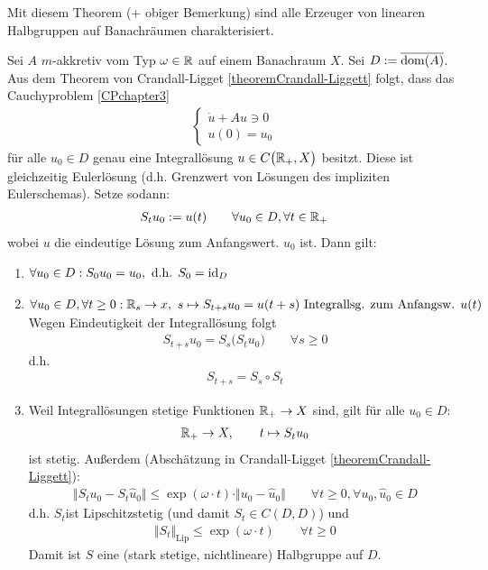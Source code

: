 Mit diesem Theorem (+ obiger Bemerkung) sind alle Erzeuger von linearen Halbgruppen auf Banachräumen charakterisiert.

\begin{beispiel}\enter
	Sei $A$ $m$-akkretiv vom Typ $\omega\in\mathbb{R}$ auf einem Banachraum $X$. Sei $D:=\overline{\operatorname{dom}(A)}$. 
	Aus dem Theorem von Crandall-Ligget \ref{theoremCrandall-Liggett} folgt, dass das Cauchyproblem \eqref{CPchapter3}
	\begin{align*}
		\left\lbrace\begin{array}{r}
			\dot{u}+Au\ni 0\\
			u(0)=u_0
		\end{array}\right.
	\end{align*}
	für alle $u_0\in D$ genau eine Integrallösung $u\in C\big(\mathbb{R}_+,X\big)$ besitzt. 
	Diese ist gleichzeitig Eulerlösung (d.h. Grenzwert von Lösungen des impliziten Eulerschemas). 
	Setze sodann:
	\begin{align*}
		S_t u_0:=u(t)\qquad\forall u_0\in D,\forall t\in\mathbb{R}_+
	\end{align*}
	wobei $u$ die eindeutige Lösung zum Anfangswert. $u_0$ ist. 
	Dann gilt:
	\begin{enumerate}[label=(\roman*)]
		\item $\begin{aligned}
			\forall u_0\in D:S_0 u_0=u_0,\text{ d.h. }S_0=\operatorname{id}_D
		\end{aligned}$
		\item $\begin{aligned}
			\forall u_0\in D,\forall t\geq 0:\mathbb{R}_s\to x,~
			s\mapsto S_{t+s} u_0=u(t+s)\text{ Integrallsg. zum Anfangsw. }u(t)
		\end{aligned}$\\
		Wegen Eindeutigkeit der Integrallösung folgt
		\begin{align*}
			S_{t+s}u_0=S_s\big( S_t u_0\big)\qquad\forall s\geq0
		\end{align*}
		d.h.
		\begin{align*}
			S_{t+s}=S_s\circ S_t
		\end{align*}
		\item Weil Integrallösungen stetige Funktionen $\mathbb{R}_+\to X$ sind, gilt für alle $u_0\in D$:
		\begin{align*}
			\mathbb{R}_+\to X,\qquad t\mapsto S_t u_0
		\end{align*}
		ist stetig. Außerdem (Abschätzung in Crandall-Ligget \ref{theoremCrandall-Liggett}):
		\begin{align*}
			\big\Vert S_t u_0-S_t\hat{u}_0\big\Vert\leq\exp(\omega\cdot t)\cdot\Vert u_0-\hat{u}_0\big\Vert\qquad\forall t\geq0,\forall u_0,\hat{u}_0\in D
		\end{align*}
		d.h. $S_t$ist Lipschitzstetig (und damit $S_t\in C(D,D)$) und 
		\begin{align*}
			\big\Vert S_t\big\Vert_{\text{Lip}}\leq\exp(\omega\cdot t)\qquad\forall t\geq0
		\end{align*}
		Damit ist $S$ eine (stark stetige, nichtlineare) Halbgruppe auf $D$.
	\end{enumerate}
\end{beispiel}

